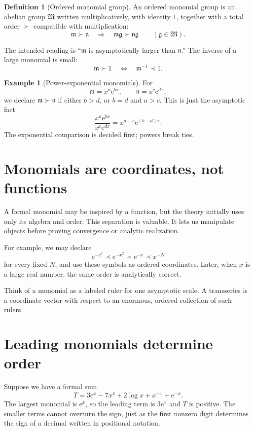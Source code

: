 \documentclass[11pt,oneside]{book}
\theoremstyle{definition}
\newtheorem{definition}[theorem]{Definition}
\newtheorem{example}[theorem]{Example}
\theoremstyle{remark}
\newcommand{\M}{\mathfrak{M}}
\newcommand{\m}{\mathfrak{m}}
\newcommand{\n}{\mathfrak{n}}
\newcommand{\g}{\mathfrak{g}}
\newcommand{\e}{\mathrm{e}}
\newcommand{\precdom}{\prec}
\newcommand{\succdom}{\succ}
\begin{document}
\begin{definition}[Ordered monomial group]
An ordered monomial group is an abelian group $\M$ written multiplicatively,
with identity $1$, together with a total order $\succdom$ compatible with
multiplication:
\[
  \m\succdom\n \quad\Longrightarrow\quad
  \m\g\succdom\n\g
  \qquad(\g\in\M).
\]
\end{definition}

The intended reading is ``$\m$ is asymptotically larger than $\n$.'' The inverse
of a large monomial is small:
\[
  \m\succdom1 \quad\Longleftrightarrow\quad \m^{-1}\precdom1.
\]

\begin{example}[Power-exponential monomials]
For
\[
  \m=x^a\e^{bx},\qquad \n=x^c\e^{dx},
\]
we declare $\m\succdom\n$ if either $b>d$, or $b=d$ and $a>c$. This is just the
asymptotic fact
\[
  \frac{x^a\e^{bx}}{x^c\e^{dx}}
  =x^{a-c}\e^{(b-d)x}.
\]
The exponential comparison is decided first; powers break ties.
\end{example}

\section{Monomials are coordinates, not functions}

A formal monomial may be inspired by a function, but the theory initially uses
only its algebra and order. This separation is valuable. It lets us manipulate
objects before proving convergence or analytic realization.

For example, we may declare
\[
  \e^{-\e^x}\precdom \e^{-x^2}\precdom\e^{-x}\precdom x^{-N}
\]
for every fixed $N$, and use these symbols as ordered coordinates. Later, when
$x$ is a large real number, the same order is analytically correct.

\begin{intuitionbox}
Think of a monomial as a labeled ruler for one asymptotic scale. A transseries is
a coordinate vector with respect to an enormous, ordered collection of such
rulers.
\end{intuitionbox}

\section{Leading monomials determine order}

Suppose we have a formal sum
\[
  T=3\e^x-7x^4+2\log x+x^{-1}+\e^{-x}.
\]
The largest monomial is $\e^x$, so the leading term is $3\e^x$ and $T$ is
positive. The smaller terms cannot overturn the sign, just as the first nonzero
digit determines the sign of a decimal written in positional notation.
\end{document}
